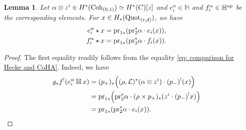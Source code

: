 \documentclass[10pt]{amsart}
\newcommand{\BH}{\mathbb{H}}
\newcommand{\CL}{\mathcal{L}}
\newcommand{\Quot}{\textnormal{Quot}}
\newcommand{\Coh}{\textnormal{Coh}}
\newcommand{\op}{\textnormal{op}}
\newcommand{\pr}{\textnormal{pr}}
\newcommand{\+}{{}^+}
\newtheorem {lemma}[theorem]{Lemma}
\theoremstyle{definition}
\theoremstyle {definition}
\theoremstyle {definition}
\begin{document}
\begin{lemma}\label{lem: Hecke and CoHA actions}
    Let $\alpha\otimes z^i\in H^*(\Coh_{(0,1)})\simeq H^*(C)[z]$ and $e_i^\alpha\in \BH$ and $f_i^\alpha\in \BH^\op$ be the corresponding elements. For $x\in H_*(\Quot_{(r,d)})$, we have
    \begin{align*}
        e_i^\alpha\star x &= \pr_{1*}(\pr_2^*\alpha\cdot e_i(x)),\\
        f_i^\alpha\star x &= \pr_{1*}(\pr_2^*\alpha\cdot f_i(x)).
    \end{align*}
    
\end{lemma}
\begin{proof}

The first equality readily follows from the equality \eqref{eq: comparison for Hecke and CoHA}. Indeed, we have 
\begin{align*}
    g_*f^!(e_i^\alpha\boxtimes x)
    &=(p_+)_*\Big((\rho,\CL)^*(\alpha\otimes z^i)\cdot (p_-)^!(x)\Big)\\
    &=\pr_{1*}\Big(\pr_2^*\alpha\cdot (\rho\times p_+)_*(z^i\cdot (p_-)^!x)\Big)\\
    &=\pr_{1*}(\pr_2^*\alpha\cdot e_i(x)).
\end{align*}


\end{proof}
\end{document}
